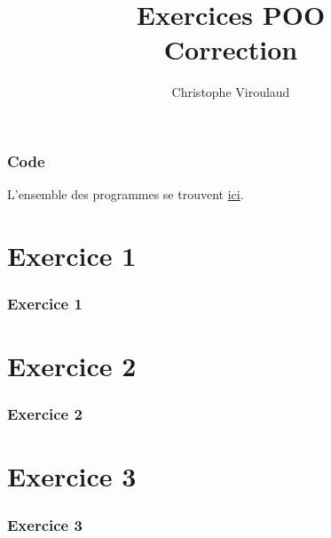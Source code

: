 \documentclass[svgnames,11pt]{beamer}
\author[]{Christophe Viroulaud}
\title{Exercices POO\\Correction}
\date{}
\institute{Terminale - NSI}
\begin{document}
\begin{frame}
\titlepage
\end{frame}
\begin{frame}
    \frametitle{Code}

    L'ensemble des programmes se trouvent \href{https://cviroulaud.github.io/terminale/langages/paradigmes/POO/exercices/scripts/poo-correction.zip}{ici}.

\end{frame}
\section{Exercice 1}
\begin{frame}
    \frametitle{Exercice 1}


\end{frame}
\begin{frame}


\end{frame}
\begin{frame}


\end{frame}
\section{Exercice 2}
\begin{frame}
    \frametitle{Exercice 2}


\end{frame}
\begin{frame}


\end{frame}
\section{Exercice 3}
\begin{frame}
    \frametitle{Exercice 3}


\end{frame}
\end{document}
